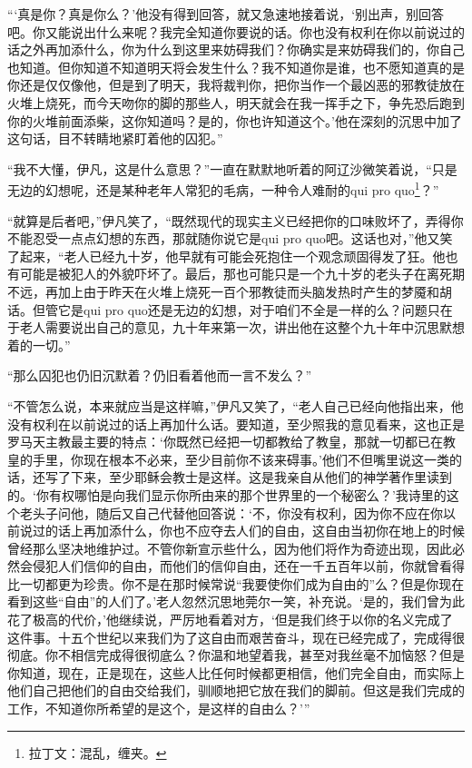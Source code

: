 \par “‘真是你？真是你么？’他没有得到回答，就又急速地接着说，‘别出声，别回答吧。你又能说出什么来呢？我完全知道你要说的话。你也没有权利在你以前说过的话之外再加添什么，你为什么到这里来妨碍我们？你确实是来妨碍我们的，你自己也知道。但你知道不知道明天将会发生什么？我不知道你是谁，也不愿知道真的是你还是仅仅像他，但是到了明天，我将裁判你，把你当作一个最凶恶的邪教徒放在火堆上烧死，而今天吻你的脚的那些人，明天就会在我一挥手之下，争先恐后跑到你的火堆前面添柴，这你知道吗？是的，你也许知道这个。’他在深刻的沉思中加了这句话，目不转睛地紧盯着他的囚犯。”
\par “我不大懂，伊凡，这是什么意思？”一直在默默地听着的阿辽沙微笑着说，“只是无边的幻想呢，还是某种老年人常犯的毛病，一种令人难耐的qui pro quo\footnote{拉丁文：混乱，缠夹。}？”
\par “就算是后者吧，”伊凡笑了，“既然现代的现实主义已经把你的口味败坏了，弄得你不能忍受一点点幻想的东西，那就随你说它是qui pro quo吧。这话也对，”他又笑了起来，“老人已经九十岁，他早就有可能会死抱住一个观念顽固得发了狂。他也有可能是被犯人的外貌吓坏了。最后，那也可能只是一个九十岁的老头子在离死期不远，再加上由于昨天在火堆上烧死一百个邪教徒而头脑发热时产生的梦魇和胡话。但管它是qui pro quo还是无边的幻想，对于咱们不全是一样的么？问题只在于老人需要说出自己的意见，九十年来第一次，讲出他在这整个九十年中沉思默想着的一切。”
\par “那么囚犯也仍旧沉默着？仍旧看着他而一言不发么？”
\par “不管怎么说，本来就应当是这样嘛，”伊凡又笑了，“老人自己已经向他指出来，他没有权利在以前说过的话上再加什么话。要知道，至少照我的意见看来，这也正是罗马天主教最主要的特点：‘你既然已经把一切都教给了教皇，那就一切都已在教皇的手里，你现在根本不必来，至少目前你不该来碍事。’他们不但嘴里说这一类的话，还写了下来，至少耶稣会教士是这样。这是我亲自从他们的神学著作里读到的。‘你有权哪怕是向我们显示你所由来的那个世界里的一个秘密么？’我诗里的这个老头子问他，随后又自己代替他回答说：‘不，你没有权利，因为你不应在你以前说过的话上再加添什么，你也不应夺去人们的自由，这自由当初你在地上的时候曾经那么坚决地维护过。不管你新宣示些什么，因为他们将作为奇迹出现，因此必然会侵犯人们信仰的自由，而他们的信仰自由，还在一千五百年以前，你就曾看得比一切都更为珍贵。你不是在那时候常说“我要使你们成为自由的”么？但是你现在看到这些“自由”的人们了。’老人忽然沉思地莞尔一笑，补充说。‘是的，我们曾为此花了极高的代价，’他继续说，严厉地看着对方，‘但是我们终于以你的名义完成了这件事。十五个世纪以来我们为了这自由而艰苦奋斗，现在已经完成了，完成得很彻底。你不相信完成得很彻底么？你温和地望着我，甚至对我丝毫不加恼怒？但是你知道，现在，正是现在，这些人比任何时候都更相信，他们完全自由，而实际上他们自己把他们的自由交给我们，驯顺地把它放在我们的脚前。但这是我们完成的工作，不知道你所希望的是这个，是这样的自由么？’”

